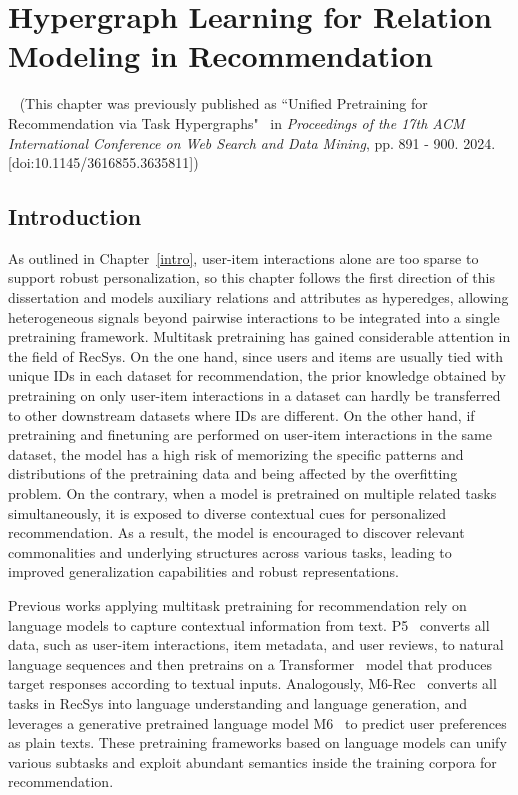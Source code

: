 \chapter{Hypergraph Learning for Relation Modeling in Recommendation}~\label{chpt:uprth}
(This chapter was previously published as ``Unified Pretraining for Recommendation via Task Hypergraphs"~\cite{uprth} in \textit{Proceedings of the 17th ACM International Conference on Web Search and Data Mining}, pp. 891 - 900. 2024. [doi:10.1145/3616855.3635811])

\section{Introduction}
As outlined in Chapter~\ref{intro}, user-item interactions alone are too sparse to support robust personalization, so this chapter follows the first direction of this dissertation and models auxiliary relations and attributes as hyperedges, allowing heterogeneous signals beyond pairwise interactions to be integrated into a single pretraining framework.
Multitask pretraining has gained considerable attention in the field of RecSys. On the one hand, since users and items are usually tied with unique IDs in each dataset for recommendation, the prior knowledge obtained by pretraining on only user-item interactions in a dataset can hardly be transferred to other downstream datasets where IDs are different. On the other hand, if pretraining and finetuning are performed on user-item interactions in the same dataset, the model has a high risk of memorizing the specific patterns and distributions of the pretraining data and being affected by the overfitting problem.
On the contrary, when a model is pretrained on multiple related tasks simultaneously, it is exposed to diverse contextual cues for personalized recommendation. As a result, the model is encouraged to discover relevant commonalities and underlying structures across various tasks, leading to improved generalization capabilities and robust representations.

Previous works applying multitask pretraining for recommendation rely on language models to capture contextual information from text. P5~\cite{p5} converts all data, such as user-item interactions, item metadata, and user reviews, to natural language sequences and then pretrains on a Transformer~\cite{transformer} model that produces target responses according to textual inputs. Analogously, M6-Rec~\cite{m6rec} converts all tasks in RecSys into language understanding and language generation, and leverages a generative pretrained language model M6~\cite{m6} to predict user preferences as plain texts. These pretraining frameworks based on language models can unify various subtasks and exploit abundant semantics inside the training corpora for recommendation.


